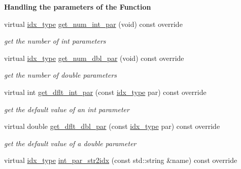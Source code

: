 \begin{Indent}\textbf{ Handling the parameters of the Function}\par
\begin{DoxyCompactItemize}
\item 
virtual \mbox{\hyperlink{class_s_m_spp__di__unipi__it_1_1_thin_compute_interface_aa3d710629ad8c434286726ad810c3b47}{idx\+\_\+type}} \mbox{\hyperlink{class_s_m_spp__di__unipi__it_1_1_function_a3ad74d9506761eb2ca4c8a936fb7a1c5}{get\+\_\+num\+\_\+int\+\_\+par}} (void) const override
\begin{DoxyCompactList}\small\item\em get the number of int parameters \end{DoxyCompactList}\item 
virtual \mbox{\hyperlink{class_s_m_spp__di__unipi__it_1_1_thin_compute_interface_aa3d710629ad8c434286726ad810c3b47}{idx\+\_\+type}} \mbox{\hyperlink{class_s_m_spp__di__unipi__it_1_1_function_a842fd454acaded84baf6b77e0d61a950}{get\+\_\+num\+\_\+dbl\+\_\+par}} (void) const override
\begin{DoxyCompactList}\small\item\em get the number of double parameters \end{DoxyCompactList}\item 
virtual int \mbox{\hyperlink{class_s_m_spp__di__unipi__it_1_1_function_a75dd1491b74c4b9476755e061dce3e04}{get\+\_\+dflt\+\_\+int\+\_\+par}} (const \mbox{\hyperlink{class_s_m_spp__di__unipi__it_1_1_thin_compute_interface_aa3d710629ad8c434286726ad810c3b47}{idx\+\_\+type}} par) const override
\begin{DoxyCompactList}\small\item\em get the default value of an int parameter \end{DoxyCompactList}\item 
virtual double \mbox{\hyperlink{class_s_m_spp__di__unipi__it_1_1_function_a465a771c115acf8d5f4e32e22f003014}{get\+\_\+dflt\+\_\+dbl\+\_\+par}} (const \mbox{\hyperlink{class_s_m_spp__di__unipi__it_1_1_thin_compute_interface_aa3d710629ad8c434286726ad810c3b47}{idx\+\_\+type}} par) const override
\begin{DoxyCompactList}\small\item\em get the default value of a double parameter \end{DoxyCompactList}\item 
virtual \mbox{\hyperlink{class_s_m_spp__di__unipi__it_1_1_thin_compute_interface_aa3d710629ad8c434286726ad810c3b47}{idx\+\_\+type}} \mbox{\hyperlink{class_s_m_spp__di__unipi__it_1_1_function_ae281b6699b0707a5cdc1e82b76d26c09}{int\+\_\+par\+\_\+str2idx}} (const std\+::string \&name) const override

\end{DoxyCompactItemize}
\end{Indent}
